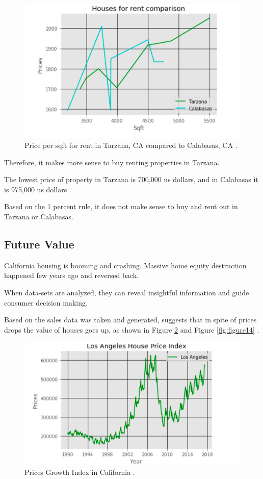 \documentclass[sigconf]{acmart}
\begin{document}
\begin{figure}
  \centering
  \includegraphics[width=1.0\columnwidth]{images/figure12.png}
  \caption{Price per sqft for rent in Tarzana, CA compared to Calabasas, CA \cite{md}.} \label{fig:figure12} 
\end{figure}

Therefore, it makes more sense to buy renting properties in Tarzana.

The lowest price of property in Tarzana is 700,000 us dollars, and in Calabasas it is 975,000 us dollars \cite{md}.

Based on the 1 percent rule, it does not make sense to buy and rent out in Tarzana or Calabasas.

\subsection{Future Value}

California housing is booming and crashing. Massive home equity destruction happened few years ago and reversed back. 

When data-sets are analyzed, they can reveal insightful information and guide consumer decision making.

Based on the sales data was taken and generated, suggests that in spite of prices drops the value of houses goes up, as shown in Figure \ref{fig:figure13} and Figure \ref{fig:figure14} \cite{md}.

\begin{figure}
  \centering
  \includegraphics[width=1.0\columnwidth]{images/figure13.png}
  \caption{Prices Growth Index in California \cite{md}.} \label{fig:figure13} 
\end{figure}
\end{document}
